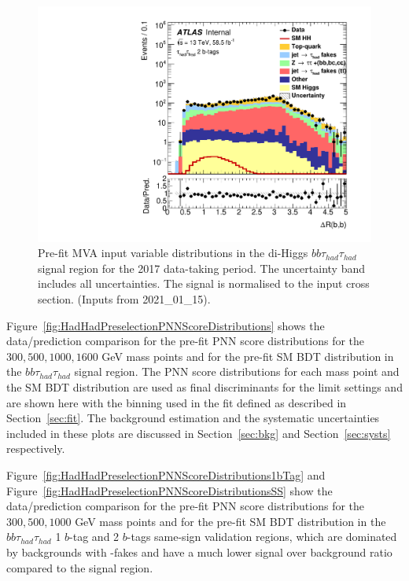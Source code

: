 \begin{figure}
\includegraphics[width=.45\textwidth]{figures/selection/HadHad_HH/Plots2018/Region_BMin0_incJet1_distdRBB_J2_Y2015_DLLOS_T2_SpcTauHH_L0_Prefitlog.pdf}
\caption{Pre-fit MVA input variable distributions in the di-Higgs
  $bb\tau_{had}\tau_{had}$ signal region for the 2017 data-taking period. The uncertainty band includes all uncertainties. The signal is normalised to the input cross section. (Inputs from 2021\_01\_15).}
\label{fig:HadHadPreselectionPNNInputsDistributions2018}
\end{figure}



Figure~\ref{fig:HadHadPreselectionPNNScoreDistributions} shows the data/prediction comparison for the pre-fit PNN score distributions for the $300, 500, 1000, 1600$ GeV mass points and for the pre-fit SM BDT distribution in the $bb\tau_{had}\tau_{had}$ signal region.  The PNN score distributions for each mass point and the SM BDT distribution are used as final discriminants for the limit settings and are shown here with the binning used in the fit defined as described in Section~\ref{sec:fit}. The background estimation and the systematic uncertainties included in these plots are discussed in Section~\ref{sec:bkg} and Section~\ref{sec:systs} respectively.

Figure~\ref{fig:HadHadPreselectionPNNScoreDistributions1bTag} and Figure~\ref{fig:HadHadPreselectionPNNScoreDistributionsSS} show the  data/prediction comparison for the pre-fit PNN score distributions for the $300, 500, 1000$ GeV mass points and for the pre-fit SM BDT distribution in the $bb\tau_{had}\tau_{had}$ 1 $b$-tag and 2 $b$-tags same-sign validation regions, which are dominated by backgrounds with \tauhad-fakes and have a much lower signal over background ratio compared to the signal region.

